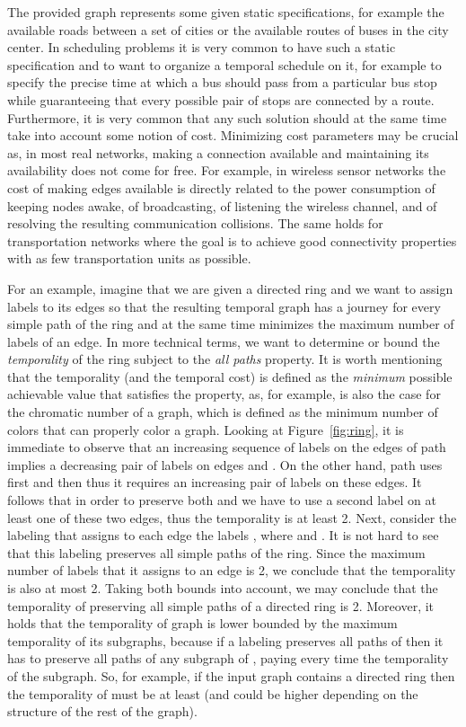 \documentclass[oribibl, 11pt]{llncs}
\begin{document}
The provided graph  represents some given static specifications, for example the available roads between a set of cities or the available routes of buses in the city center. In scheduling problems it is very common to have such a static specification and to want to organize a temporal schedule on it, for example to specify the precise time at which a bus should pass from a particular bus stop while guaranteeing that every possible pair of stops are connected by a route. Furthermore, it is very common that any such solution should at the same time take into account some notion of cost. Minimizing cost parameters may be crucial as, in most real networks, making a connection available and maintaining its availability does not come for free. For example, in wireless sensor networks the cost of making edges available is directly related to the power consumption of keeping nodes awake, of broadcasting, of listening the wireless channel, and of resolving the resulting communication collisions. The same holds for transportation networks where the goal is to achieve good connectivity properties with as few transportation units as possible.

For an example, imagine that we are given a directed ring  and we want to assign labels to its edges so that the resulting temporal graph has a journey for every simple path of the ring and at the same time minimizes the maximum number of labels of an edge. In more technical terms, we want to determine or bound the \emph{temporality} of the ring subject to the \emph{all paths} property. It is worth mentioning that the temporality (and the temporal cost) is defined as the \emph{minimum} possible achievable value that satisfies the property, as, for example, is also the case for the chromatic number of a graph, which is defined as the minimum number of colors that can properly color a graph. Looking at Figure~\ref{fig:ring}, it is immediate to observe that an increasing sequence of labels on the edges of path  implies a decreasing pair of labels on edges  and . On the other hand, path  uses first  and then  thus it requires an increasing pair of labels on these edges. It follows that in order to preserve both  and  we have to use a second label on at least one of these two edges, thus the temporality is at least 2. Next, consider the labeling that assigns to each edge  the labels , where  and . It is not hard to see that this labeling preserves all simple paths of the ring. Since the maximum number of labels that it assigns to an edge is 2, we conclude that the temporality is also at most 2. Taking both bounds into account, we may conclude that the temporality of preserving all simple paths of a directed ring is 2. Moreover, it holds that the temporality of graph  is lower bounded by the maximum temporality of its subgraphs, because if a labeling preserves all paths of  then it has to preserve all paths of any subgraph of , paying every time the temporality of the subgraph. So, for example, if the input graph  contains a directed ring then the temporality of  must be at least  (and could be higher depending on the structure of the rest of the graph).   
\end{document}

